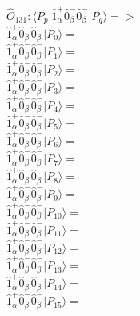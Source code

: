 \documentclass[14pt]{article}
\begin{document}
    $\hat{O}_{131}:  \langle{P_p}\vert \hat{1}_{\alpha}^{+}\hat{0}_{\beta}^{-}\hat{0}_{\beta}^{-} \vert{P_q}\rangle => $ \\ 
    $ \hat{1}_{\alpha}^{+}\hat{0}_{\beta}^{-}\hat{0}_{\beta}^{-} \vert{P_{0}}\rangle =  $ \\ 
    $ \hat{1}_{\alpha}^{+}\hat{0}_{\beta}^{-}\hat{0}_{\beta}^{-} \vert{P_{1}}\rangle =  $ \\ 
    $ \hat{1}_{\alpha}^{+}\hat{0}_{\beta}^{-}\hat{0}_{\beta}^{-} \vert{P_{2}}\rangle =  $ \\ 
    $ \hat{1}_{\alpha}^{+}\hat{0}_{\beta}^{-}\hat{0}_{\beta}^{-} \vert{P_{3}}\rangle =  $ \\ 
    $ \hat{1}_{\alpha}^{+}\hat{0}_{\beta}^{-}\hat{0}_{\beta}^{-} \vert{P_{4}}\rangle =  $ \\ 
    $ \hat{1}_{\alpha}^{+}\hat{0}_{\beta}^{-}\hat{0}_{\beta}^{-} \vert{P_{5}}\rangle =  $ \\ 
    $ \hat{1}_{\alpha}^{+}\hat{0}_{\beta}^{-}\hat{0}_{\beta}^{-} \vert{P_{6}}\rangle =  $ \\ 
    $ \hat{1}_{\alpha}^{+}\hat{0}_{\beta}^{-}\hat{0}_{\beta}^{-} \vert{P_{7}}\rangle =  $ \\ 
    $ \hat{1}_{\alpha}^{+}\hat{0}_{\beta}^{-}\hat{0}_{\beta}^{-} \vert{P_{8}}\rangle =  $ \\ 
    $ \hat{1}_{\alpha}^{+}\hat{0}_{\beta}^{-}\hat{0}_{\beta}^{-} \vert{P_{9}}\rangle =  $ \\ 
    $ \hat{1}_{\alpha}^{+}\hat{0}_{\beta}^{-}\hat{0}_{\beta}^{-} \vert{P_{10}}\rangle =  $ \\ 
    $ \hat{1}_{\alpha}^{+}\hat{0}_{\beta}^{-}\hat{0}_{\beta}^{-} \vert{P_{11}}\rangle =  $ \\ 
    $ \hat{1}_{\alpha}^{+}\hat{0}_{\beta}^{-}\hat{0}_{\beta}^{-} \vert{P_{12}}\rangle =  $ \\ 
    $ \hat{1}_{\alpha}^{+}\hat{0}_{\beta}^{-}\hat{0}_{\beta}^{-} \vert{P_{13}}\rangle =  $ \\ 
    $ \hat{1}_{\alpha}^{+}\hat{0}_{\beta}^{-}\hat{0}_{\beta}^{-} \vert{P_{14}}\rangle =  $ \\ 
    $ \hat{1}_{\alpha}^{+}\hat{0}_{\beta}^{-}\hat{0}_{\beta}^{-} \vert{P_{15}}\rangle =  $ \\ 
    
\end{document}
